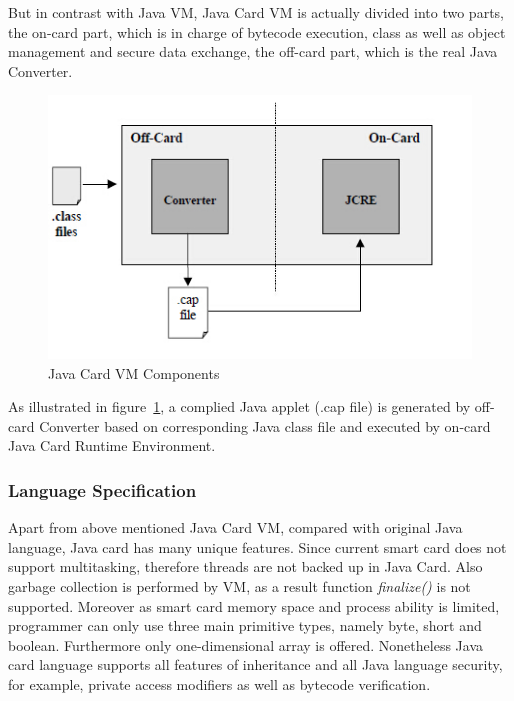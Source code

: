 \documentclass[]{llncs}
\begin{document}
But in contrast with Java VM, Java Card VM is actually divided into two parts, the on-card part, which is in charge of bytecode execution, class as well as object management and secure data  exchange, the off-card part, which is the real Java Converter.
 \begin{figure}[!htbp]
	\centering
	\includegraphics[width=1\textwidth]{jcvm.jpg}
		\caption[ ]{Java Card VM Components\cite{jcadg}}
	\label{fig:jcvm}
\end{figure}
As illustrated in figure~\ref{fig:jcvm}, a complied Java applet (.cap file) is generated by off-card Converter based on corresponding Java class file and executed by on-card Java Card Runtime Environment. 

\subsubsection{Language Specification}
Apart from above mentioned Java Card VM, compared with original Java language, Java card has many unique features.
Since current smart card does not support multitasking, therefore threads are not backed up in Java Card. Also garbage collection  is performed by VM, as a result function \emph{finalize()} is not supported. Moreover as smart card memory space and process ability is limited, programmer can only use three main primitive types, namely byte, short and boolean. Furthermore only one-dimensional array is offered. Nonetheless Java card language supports all features  of inheritance  and all Java language security, for example, private access modifiers as well as bytecode verification\cite{jcadg}.
\end{document}
